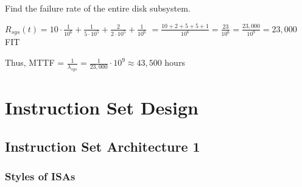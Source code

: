 \documentclass[12pt]{extarticle}
\begin{document}
	Find the failure rate of the entire disk subsystem.

	$R_{sys}(t) = 10 \cdot \frac{1}{10^6} + \frac{1}{5 \cdot 10^5} + \frac{2}{2 \cdot 10^5} + \frac{1}{10^6}$
	$			= \frac{10 + 2 + 5 + 5 + 1}{10^6} = \frac{23}{10^6} = \frac{23,000}{10^9} = 23,000$ FIT

	Thus, MTTF = $\frac{1}{\lambda_{sys}} = \frac{1}{23,000} \cdot 10^9 \approx 43,500$ hours

	\section{Instruction Set Design}

	\subsection{Instruction Set Architecture 1}

	\subsubsection{Styles of ISAs}
\end{document}
